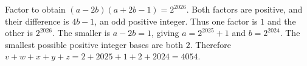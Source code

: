 Factor to obtain $(a-2b)(a+2b-1)=2^{2026}$. Both factors are positive, and their difference is $4b-1$, an odd positive integer. Thus one factor is $1$ and the other is $2^{2026}$. The smaller is $a-2b=1$, giving $a=2^{2025}+1$ and $b=2^{2024}$. The smallest possible positive integer bases are both $2$. Therefore $\boxed{v+w+x+y+z=2+2025+1+2+2024=4054}$.
